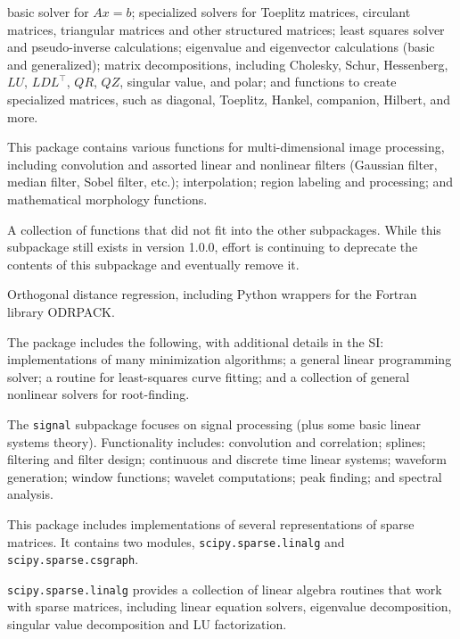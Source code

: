 \begin{description}[leftmargin=!, labelwidth=\widthof{\bfseries \texttt{interpolate}}]
    basic solver for $Ax = b$;
    specialized solvers for Toeplitz matrices, circulant matrices, triangular
    matrices and other structured matrices; least squares solver and
    pseudo-inverse calculations; eigenvalue and eigenvector calculations
    (basic and generalized); matrix decompositions, including Cholesky, Schur,
    Hessenberg, $LU$, $LDL^{\intercal}$, $QR$, $QZ$, singular value, and polar;
    and functions to create specialized matrices, such as diagonal, Toeplitz,
    Hankel, companion, Hilbert, and more.
\item[\texttt{ndimage}]
    This package contains various functions for multi-dimensional image
    processing, including convolution and assorted linear and nonlinear
    filters (Gaussian filter, median filter, Sobel filter, etc.);
    interpolation; region labeling and processing; and mathematical morphology
    functions.
\item[\texttt{misc}]
    A collection of functions that did not fit into the other subpackages.
    While this subpackage still exists in version 1.0.0, effort is continuing
    to deprecate the contents of this subpackage and eventually remove it.
\item[\texttt{odr}]
    Orthogonal distance regression, including Python wrappers for the Fortran
    library ODRPACK.
\item[\texttt{optimize}]
    The package includes the following, with additional details in the SI:
    implementations of many minimization algorithms; a general linear
    programming solver; a routine for least-squares curve fitting; and a
    collection of general nonlinear solvers for root-finding.
\item[\texttt{signal}]
    The \texttt{signal} subpackage focuses on signal processing (plus some
    basic linear systems theory).  Functionality includes:
    convolution and correlation; splines; filtering and filter design;
    continuous and discrete time linear systems; waveform generation;
    window functions; wavelet computations; peak finding; and spectral
    analysis.  
\item[\texttt{sparse}]
    This package includes implementations of several representations of
    sparse matrices.  It contains two modules, 
    \texttt{scipy.sparse.linalg} and \texttt{scipy.sparse.csgraph}.

    \texttt{scipy.sparse.linalg} provides a collection of linear algebra
    routines that work with sparse matrices, including linear equation
    solvers, eigenvalue decomposition, singular value decomposition
    and LU factorization.


\end{description}
